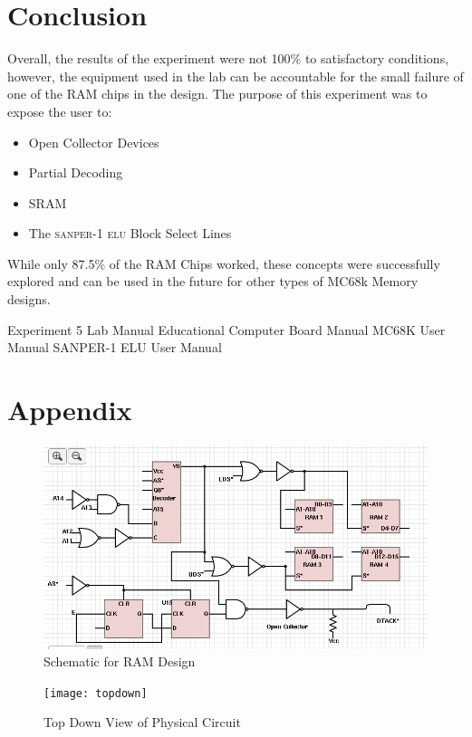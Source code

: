 \documentclass[12pt, twocolumn]{article}
\newcommand{\sanper}{\textsc{sanper-1 elu} }
\begin{document}
\section{Conclusion} 
Overall, the results of the experiment were not 100\% to satisfactory conditions, however, the equipment used in the lab can be accountable for the small failure of one of the RAM chips in the design. The purpose of this experiment was to expose the user to:
\begin{itemize}
	\item Open Collector Devices
	\item Partial Decoding
	\item SRAM
	\item The \sanper Block Select Lines
\end{itemize} 
While only 87.5\% of the RAM Chips worked, these concepts were successfully explored and can be used in the future for other types of MC68k Memory designs.
\begin{thebibliography}{1}
	 Experiment 5 Lab Manual
	 Educational Computer Board Manual
	MC68K User Manual
	SANPER-1 ELU User Manual
	
	
\end{thebibliography}
  
\onecolumn
\section{Appendix}
\label{appendix}

\begin{figure}[H]
	\centering
	\includegraphics[width=1\linewidth]{schematic}
	\caption{Schematic for RAM Design}
	\label{fig:schematic}
\end{figure}
\begin{figure}[H]
\centering
\texttt{[image: topdown]}
\caption{Top Down View of Physical Circuit}
\label{fig:topdown}
\end{figure}
\end{document}

